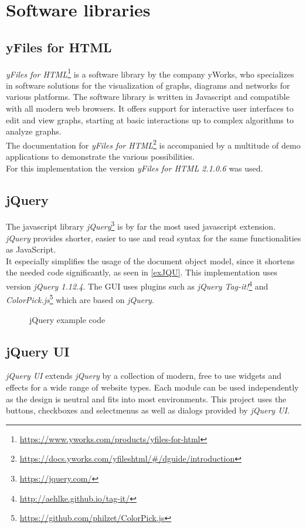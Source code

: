 \section{Software libraries}
\subsection{yFiles for HTML}
\textit{yFiles for HTML}\footnote{\url{https://www.yworks.com/products/yfiles-for-html}} 
is a software library by the company yWorks, who specializes in software solutions for the visualization of graphs, diagrams and networks for various platforms.
The software library is written in Javascript and compatible with all modern web browsers. It offers support for interactive user interfaces to edit and view graphs, starting at basic interactions up to complex algorithms to analyze graphs.\\
The documentation for \textit{yFiles for HTML}\footnote{\url{https://docs.yworks.com/yfileshtml/\#/dguide/introduction}} is accompanied by a multitude of demo applications to demonstrate the various possibilities.\\
For this implementation the version \textit{yFiles for HTML 2.1.0.6} was used.
\subsection{jQuery}
The javascript library \textit{jQuery}\footnote{\url{https://jquery.com/}} is by far the most used javascript extension. \textit{jQuery} provides shorter, easier to use and read syntax for the same functionalities as JavaScript.\\
It especially simplifies the usage of the document object model, since it shortens the needed code significantly, as seen in \autoref{exJQU}.
This implementation uses version \textit{jQuery 1.12.4}. The GUI uses plugins such as \textit{jQuery Tag-it!}\footnote{\url{http://aehlke.github.io/tag-it/}} and \textit{ColorPick.js}\footnote{\url{https://github.com/philzet/ColorPick.js}} which are based on \textit{jQuery}.  
\begin{figure}[!h]

\caption{jQuery example code}
\label{exJQU}
\end{figure}
\subsection{jQuery UI}
\textit{jQuery UI} extends \textit{jQuery} by a collection of modern, free to use widgets and effects for a wide range of website types. Each module can be used independently as the design is neutral and fits into most environments. This project uses the buttons, checkboxes and selectmenus as well as dialogs provided by \textit{jQuery UI}.

\clearpage

